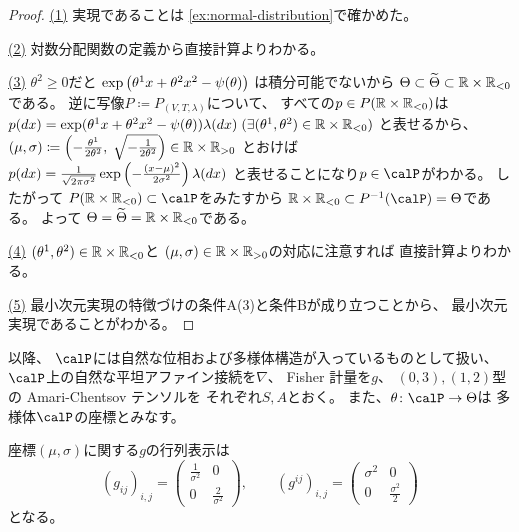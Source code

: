 \documentclass[report]{jlreq}
\begin{document}
\begin{proof}
    \uline{(1)} \quad
    実現であることは
    \cref{ex:normal-distribution}で確かめた。

    \uline{(2)} \quad
    対数分配関数の定義から直接計算よりわかる。

    \uline{(3)} \quad
    $\theta^2 \ge 0$だと
    $\exp\left({
        \theta^1 x
        + \theta^2 x^2
        - \psi(\theta)
    }\right)$
    は積分可能でないから
    $\Theta \subset \widetilde{\Theta} \subset \mathbb{R} \times \mathbb{R}_{< 0}$
    である。
    逆に写像$P \coloneqq P_{(V, T, \lambda)}$について、
    すべての$p \in P(\mathbb{R} \times \mathbb{R}_{< 0})$は
    $p(dx) = \exp(
        \theta^1 x
        + \theta^2 x^2
        - \psi(\theta)
    ) \lambda(dx)
        \; (\exists (\theta^1, \theta^2) \in \mathbb{R} \times \mathbb{R}_{< 0})$
    と表せるから、
    $(\mu, \sigma) \coloneqq \left({
        - \frac{\theta^1}{2\theta^2}, \;
        \sqrt{- \frac{1}{2\theta^2}}
    }\right) \in \mathbb{R} \times \mathbb{R}_{> 0}$
    とおけば
    $p(dx) = \frac{1}{\sqrt{2 \pi \sigma^2}}
        \exp\left({
            - \frac{(x - \mu)^2}{2 \sigma^2}
        }\right) \lambda(dx)$
    と表せることになり$p \in \calP$がわかる。
    したがって
    $P(\R \times \R_{< 0}) \subset \calP$をみたすから
    $\R \times \R_{< 0} \subset P^{-1}(\calP) =  \Theta$である。
    よって
    $\Theta = \widetilde{\Theta} = \mathbb{R} \times \mathbb{R}_{< 0}$である。

    \uline{(4)} \quad
    $(\theta^1, \theta^2) \in \mathbb{R} \times \mathbb{R}_{< 0}$と
    $(\mu, \sigma) \in \mathbb{R} \times \mathbb{R}_{> 0}$の対応に注意すれば
    直接計算よりわかる。

    \uline{(5)} \quad
    最小次元実現の特徴づけの条件A(3)と条件Bが成り立つことから、
    最小次元実現であることがわかる。
\end{proof}

以降、
$\calP$には自然な位相および多様体構造が入っているものとして扱い、
$\calP$上の自然な平坦アファイン接続を$\nabla$、
Fisher 計量を$g$、
$(0, 3), (1, 2)$型の Amari-Chentsov テンソルを
それぞれ$S, A$とおく。
また、$\theta \colon \calP \to \Theta$は
多様体$\calP$の座標とみなす。

\begin{proposition}
    座標$(\mu, \sigma)$に関する$g$の行列表示は
    \begin{equation}
        (g_{ij})_{i, j}
            = \begin{pmatrix}
                \frac{1}{\sigma^2} & 0 \\
                0 & \frac{2}{\sigma^2}
            \end{pmatrix},
            \qquad
        (g^{ij})_{i, j}
            = \begin{pmatrix}
                \sigma^2 & 0 \\
                0 & \frac{\sigma^2}{2}
            \end{pmatrix}
    \end{equation}
    となる。
\end{proposition}
\end{document}
